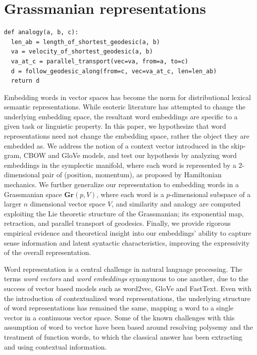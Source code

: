 \documentclass{book}
\begin{document}
\chapter{Grassmanian representations}
\begin{verbatim}
def analogy(a, b, c):
  len_ab = length_of_shortest_geodesic(a, b)
  va = velocity_of_shortest_geodesic(a, b)
  va_at_c = parallel_transport(vec=va, from=a, to=c)
  d = follow_geodesic_along(from=c, vec=va_at_c, len=len_ab)
  return d
\end{verbatim}

Embedding words in vector spaces has become the norm for distributional
lexical semantic representations. While esoteric literature has attempted
to change the underlying embedding space, the resultant word embeddings are
specific to a given task or linguistic property. In this paper, we
hypothesize that word representations need not change the embedding space,
rather the object they are embedded as. We address the notion of a context
vector introduced in the skip-gram, CBOW and GloVe models, and test our
hypothesis by analyzing word embeddings in the symplectic manifold, where
each word is represented by a 2-dimensional pair of (position, momentum),
as proposed by Hamiltonian mechanics. We further generalize our
representation to embedding words in a Grassmanian space $\mathbf{Gr}(p, V)$,
where each word is a $p$-dimensional subspace of a larger $n$
dimensional vector space $V$, and similarity and analogy are computed
exploiting the Lie theoretic structure of the Grassmanian; its exponential
map, retraction, and parallel transport of geodesics. Finally, we provide
rigorous empirical evidence and theoretical insight into our embeddings'
ability to capture sense information and latent syntactic characteristics,
improving the expressivity of the overall representation.

Word representation is a central challenge in natural language processing. The
terms \emph{word vectors} and \emph{word embeddings} synonymous to one another,
due to the success of vector based models such as word2vec, GloVe and FastText.
Even with the introduction of contextualized word representations, the
underlying structure of word representations has remained the same, mapping a
word to a single vector in a continuous vector space. Some of the known
challenges with this assumption of word to vector have been based around
resolving polysemy and the treatment of function words, to which the classical
answer has been extracting and using contextual information. 
\end{document}
